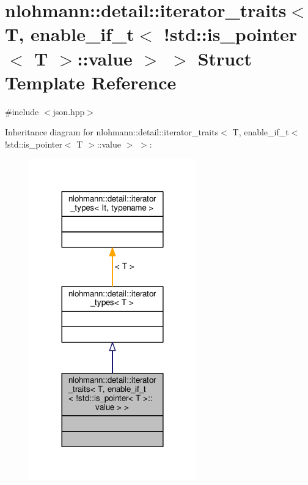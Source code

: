 \hypertarget{structnlohmann_1_1detail_1_1iterator__traits_3_01T_00_01enable__if__t_3_01_9std_1_1is__pointer_3_01T_01_4_1_1value_01_4_01_4}{}\section{nlohmann\+:\+:detail\+:\+:iterator\+\_\+traits$<$ T, enable\+\_\+if\+\_\+t$<$ !std\+:\+:is\+\_\+pointer$<$ T $>$\+:\+:value $>$ $>$ Struct Template Reference}
\label{structnlohmann_1_1detail_1_1iterator__traits_3_01T_00_01enable__if__t_3_01_9std_1_1is__pointer_3_01T_01_4_1_1value_01_4_01_4}


{\ttfamily \#include $<$json.\+hpp$>$}



Inheritance diagram for nlohmann\+:\+:detail\+:\+:iterator\+\_\+traits$<$ T, enable\+\_\+if\+\_\+t$<$ !std\+:\+:is\+\_\+pointer$<$ T $>$\+:\+:value $>$ $>$\+:
\nopagebreak
\begin{figure}[H]
\begin{center}
\leavevmode
\includegraphics[width=204pt]{structnlohmann_1_1detail_1_1iterator__traits_3_01T_00_01enable__if__t_3_01_9std_1_1is__pointer_31bae2175447e35a79f8ff22df87ddb2a}
\end{center}
\end{figure}


